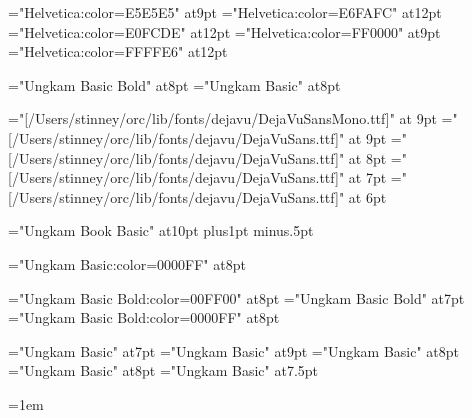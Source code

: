 


\font\hveee="Helvetica:color=E5E5E5" at9pt
\font\hveff="Helvetica:color=E6FAFC" at12pt
\font\hvefd="Helvetica:color=E0FCDE" at12pt
\font\hvfee="Helvetica:color=FF0000" at9pt
\font\hvffe="Helvetica:color=FFFFE6" at12pt

\let\seq\relax
\let\lname\relax
\let\sname\relax
\let\uname\relax
\let\chars\relax
\let\names\relax
\let\glyph\relax
\let\rglyf\relax
\let\image\relax
\let\notes\relax
\let\stags\relax
\let\fseq\relax
\let\fseqc\relax
\let\fseqh\relax
\let\sqdbcun\relax
\let\sqdbpua\relax
\let\sqseq\relax
\let\sqinv\relax
\let\sqchr\relax

\let\imagefloat\relax
\let\imagecaption\relax

\def\ucode#1{\sf\eight\rm}

\let\remfor\relax
\let\Hhhhh\relax

\let\glyf\relax
\let\fchr\relax
\let\fhex\relax
\let\dist\relax
\let\rhex\relax

\let\sl\relax
\let\slc\relax
\let\slcc\relax
\let\cdligh\relax
\let\zatu\relax
\def\diffc{\let\ofspc\relax\pcfee}
\def\diffd{\message{hvfee}\hvfee}

\font\slnmfont="Ungkam Basic Bold" at8pt
\font\sltgfont="Ungkam Basic" at8pt

\font\mono="[/Users/stinney/orc/lib/fonts/dejavu/DejaVuSansMono.ttf]" at 9pt
\font\sans="[/Users/stinney/orc/lib/fonts/dejavu/DejaVuSans.ttf]" at 9pt
\font\sansb="[/Users/stinney/orc/lib/fonts/dejavu/DejaVuSans.ttf]" at 8pt
\font\sansc="[/Users/stinney/orc/lib/fonts/dejavu/DejaVuSans.ttf]" at 7pt
\font\sansd="[/Users/stinney/orc/lib/fonts/dejavu/DejaVuSans.ttf]" at 6pt

\font\mainfont="Ungkam Book Basic" at10pt
\baselineskip12pt plus1pt minus.5pt

\font\blungkam="Ungkam Basic:color=0000FF" at8pt

\font\slnmfontw="Ungkam Basic Bold:color=00FF00" at8pt
\font\slnmfontx="Ungkam Basic Bold" at7pt
\font\slnmfonty="Ungkam Basic Bold:color=0000FF" at8pt

\font\akafont="Ungkam Basic" at7pt
\font\sldistfont="Ungkam Basic" at9pt
\font\oidfont="Ungkam Basic" at8pt
\font\oidfontx="Ungkam Basic" at8pt
\font\zatufont="Ungkam Basic" at7.5pt

\oidfont{}=1em %

